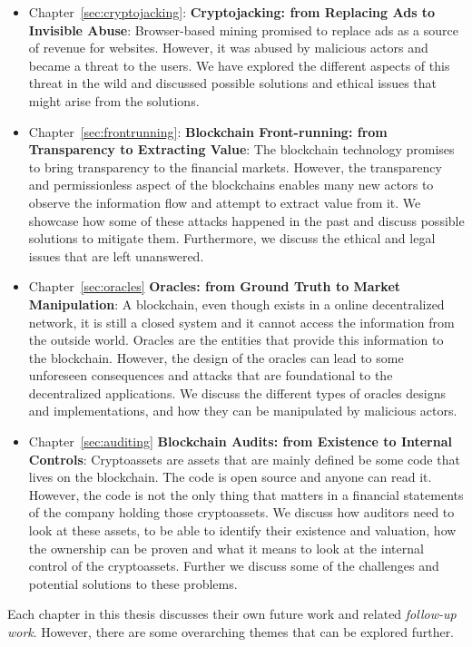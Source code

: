 \begin{itemize}
    \item Chapter~\ref{sec:cryptojacking}: \textbf{Cryptojacking: from Replacing Ads to Invisible Abuse}: Browser-based mining promised to replace ads as a source of revenue for websites. However, it was abused by malicious actors and became a threat to the users. We have explored the different aspects of this threat in the wild and discussed possible solutions and ethical issues that might arise from the solutions.
    \item Chapter~\ref{sec:frontrunning}: \textbf{Blockchain Front-running: from Transparency to Extracting Value}: The blockchain technology promises to bring transparency to the financial markets. However, the transparency and permissionless aspect of the blockchains enables many new actors to observe the information flow and attempt to extract value from it. We showcase how some of these attacks happened in the past and discuss possible solutions to mitigate them. Furthermore, we discuss the ethical and legal issues that are left unanswered.
    \item Chapter~\ref{sec:oracles} \textbf{Oracles: from Ground Truth to Market Manipulation}: A blockchain, even though exists in a online decentralized network, it is still a closed system and it cannot access the information from the outside world. Oracles are the entities that provide this information to the blockchain. However, the design of the oracles can lead to some unforeseen consequences and attacks that are foundational to the decentralized applications. We discuss the different types of oracles designs and implementations, and how they can be manipulated by malicious actors. 
    \item Chapter~\ref{sec:auditing} \textbf{Blockchain Audits: from Existence to Internal Controls}: Cryptoassets are assets that are mainly defined be some code that lives on the blockchain. The code is open source and anyone can read it. However, the code is not the only thing that matters in a financial statements of the company holding those cryptoassets. We discuss how auditors need to look at these assets, to be able to identify their existence and valuation, how the ownership can be proven and what it means to look at the internal control of the cryptoassets. Further we discuss some of the challenges and potential solutions to these problems. 
\end{itemize}


Each chapter in this thesis discusses their own future work and related \textit{follow-up work}. However, there are some overarching themes that can be explored further. %

